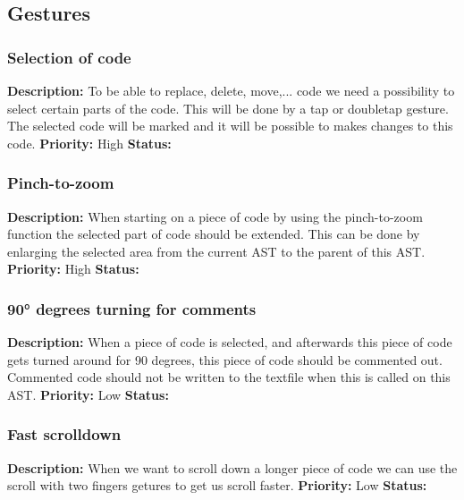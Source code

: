 \documentclass[a4paper,12pt]{report}
\begin{document}
\subsection{Gestures}
\subsubsection{Selection of code}
\textbf{Description: } To be able to replace, delete, move,... code we need a possibility to select certain parts of the code. This will be done
by a tap or doubletap gesture. The selected code will be marked and it will be possible to makes changes to this code.\newline
\textbf{Priority:} High \newline
\textbf{Status: } \newline
\subsubsection{Pinch-to-zoom}
\textbf{Description: }When starting on a piece of code by using the pinch-to-zoom function the selected part of code should be extended. This can be done by enlarging the selected
area from the current AST to the parent of this AST. \newline
\textbf{Priority:} High \newline
\textbf{Status: } \newline
\subsubsection{90° degrees turning for comments}
\textbf{Description: }When a piece of code is selected, and afterwards this piece of code gets turned around for 90 degrees, this piece of code should be commented out. 
Commented code should not be written to the textfile when this is called on this AST. \newline
\textbf{Priority:} Low \newline
\textbf{Status: } \newline
\subsubsection{Fast scrolldown}
\textbf{Description: }When we want to scroll down a longer piece of code we can use the scroll with two fingers getures to get us scroll faster. \newline
\textbf{Priority:} Low \newline
\textbf{Status: } \newline
\end{document}
